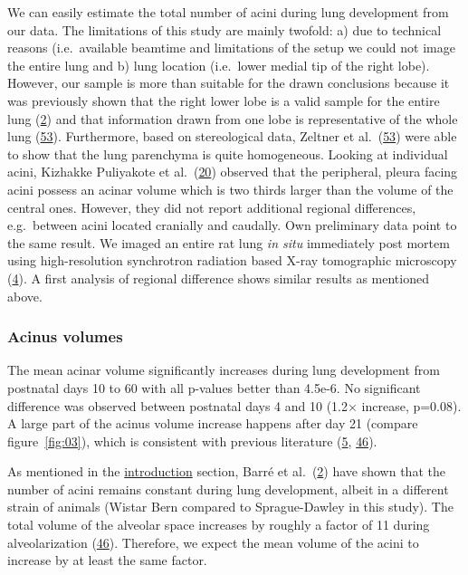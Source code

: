 \documentclass[
  american,
]{article}
\begin{document}
We can easily estimate the total number of acini during lung development from our data.
The limitations of this study are mainly twofold: a) due to technical reasons (i.e.~available beamtime and limitations of the setup we could not image the entire lung and b) lung location (i.e.~lower medial tip of the right lobe).
However, our sample is more than suitable for the drawn conclusions because it was previously shown that the right lower lobe is a valid sample for the entire lung (\protect\hyperlink{ref-14OP85b2F}{2}) and that information drawn from one lobe is representative of the whole lung (\protect\hyperlink{ref-I9TmP6IU}{53}).
Furthermore, based on stereological data, Zeltner et al.~(\protect\hyperlink{ref-I9TmP6IU}{53}) were able to show that the lung parenchyma is quite homogeneous.
Looking at individual acini, Kizhakke Puliyakote et al.~(\protect\hyperlink{ref-RGBeCf8v}{20}) observed that the peripheral, pleura facing acini possess an acinar volume which is two thirds larger than the volume of the central ones.
However, they did not report additional regional differences, e.g.~between acini located cranially and caudally.
Own preliminary data point to the same result.
We imaged an entire rat lung \emph{in situ} immediately post mortem using high-resolution synchrotron radiation based X-ray tomographic microscopy (\protect\hyperlink{ref-Zv1XcgAO}{4}).
A first analysis of regional difference shows similar results as mentioned above.

\hypertarget{acinus-volumes}{%
\subsubsection{Acinus volumes}\label{acinus-volumes}}

The mean acinar volume significantly increases during lung development from postnatal days 10 to 60 with all p-values better than 4.5e-6.
No significant difference was observed between postnatal days 4 and 10 (1.2× increase, p=0.08).
A large part of the acinus volume increase happens after day 21 (compare figure~\ref{fig:03}), which is consistent with previous literature (\protect\hyperlink{ref-auNiE56G}{5}, \protect\hyperlink{ref-wnl86DEM}{46}).

As mentioned in the \protect\hyperlink{introduction}{introduction} section, Barré et al.~(\protect\hyperlink{ref-14OP85b2F}{2}) have shown that the number of acini remains constant during lung development, albeit in a different strain of animals (Wistar Bern compared to Sprague-Dawley in this study).
The total volume of the alveolar space increases by roughly a factor of 11 during alveolarization (\protect\hyperlink{ref-wnl86DEM}{46}).
Therefore, we expect the mean volume of the acini to increase by at least the same factor.
\end{document}
